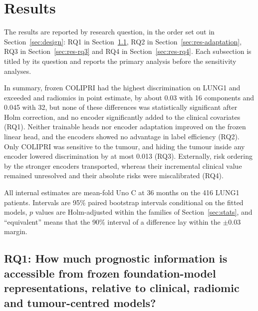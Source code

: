 \section{Results}\label{sec:results}
The results are reported by research question, in the order set out in Section~\ref{sec:design}: RQ1 in Section~\ref{sec:res-rq1}, RQ2 in Section~\ref{sec:res-adaptation}, RQ3 in Section~\ref{sec:res-rq3} and RQ4 in Section~\ref{sec:res-rq4}. Each subsection is titled by its question and reports the primary analysis before the sensitivity analyses.

In summary, frozen COLIPRI had the highest discrimination on LUNG1 and exceeded  and radiomics in point estimate, by about 0.03 with 16 components and 0.045 with 32, but none of these differences was statistically significant after Holm correction, and no encoder significantly added to the clinical covariates (RQ1). Neither trainable heads nor encoder adaptation improved on the frozen linear head, and the encoders showed no advantage in label efficiency (RQ2). Only COLIPRI was sensitive to the tumour, and hiding the tumour inside any encoder lowered discrimination by at most 0.013 (RQ3). Externally, risk ordering by the stronger encoders transported, whereas their incremental clinical value remained unresolved and their absolute risks were miscalibrated (RQ4).

All internal estimates are mean-fold Uno C at 36 months on the 416 LUNG1 patients. Intervals are 95\% paired bootstrap intervals conditional on the fitted models, $p$ values are Holm-adjusted within the families of Section~\ref{sec:stats}, and ``equivalent'' means that the 90\% interval of a difference lay within the $\pm0.03$ margin.

\subsection{RQ1: How much prognostic information is accessible from frozen foundation-model representations, relative to clinical, radiomic and tumour-centred models?}\label{sec:res-rq1}

